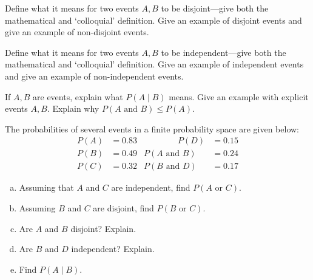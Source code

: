 \documentclass[11pt,letterpaper]{article}
\begin{document}

 Define what it means for two events $A, B$ to be disjoint---give both the mathematical and `colloquial' definition. Give an example of disjoint events and give an example of non-disjoint events. 



\newpage



 Define what it means for two events $A, B$ to be independent---give both the mathematical and `colloquial' definition. Give an example of independent events and give an example of non-independent events. 



\newpage



 If $A, B$ are events, explain what $P(A \;|\; B)$ means. Give an example with explicit events $A, B$. Explain why $P(A \text{ and } B) \leq P(A)$. 



\newpage



 The probabilities of several events in a finite probability space are given below:
	\[
	\begin{aligned}
	P(A)&= 0.83 &\qquad\qquad P(D)&= 0.15 \\
	P(B)&= 0.49 & P(A \text{ and } B)&= 0.24 \\
	P(C)&= 0.32 & P(B \text{ and } D)&= 0.17 
	\end{aligned}
	\] 

\begin{enumerate}[(a)]
\item Assuming that $A$ and $C$ are independent, find $P(A \text{ or } C)$.
\item Assuming $B$ and $C$ are disjoint, find $P(B \text{ or } C)$.
\item Are $A$ and $B$ disjoint? Explain.
\item Are $B$ and $D$ independent? Explain. 
\item Find $P(A \;|\; B)$.
\end{enumerate}
\end{document}
